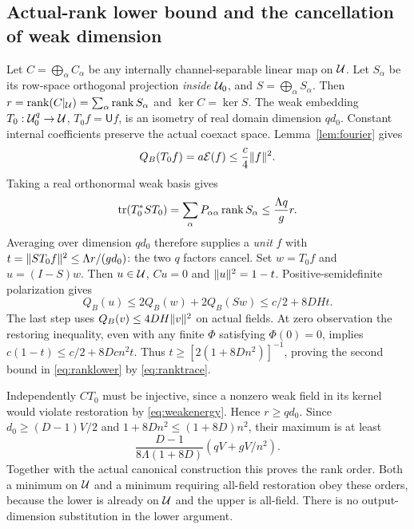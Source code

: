 \subsection{Actual-rank lower bound and the cancellation of weak dimension}
Let $C=\bigoplus_\alpha C_\alpha$ be any internally channel-separable linear
map on $\mathcal U$. Let $S_\alpha$ be its row-space orthogonal projection
\emph{inside} $\mathcal U_0$, and $S=\bigoplus_\alpha S_\alpha$. Then
$r=\operatorname{rank}(C|_\mathcal U)=\sum_\alpha\operatorname{rank} S_\alpha$ and $\ker C=\ker S$.
The weak embedding $T_0:\mathcal U_0^q\to\mathcal U$, $T_0f=\mathsf U f$, is an isometry
of real domain dimension $qd_0$. Constant internal coefficients preserve the
actual coexact space. Lemma~\ref{lem:fourier} gives
\begin{equation}\label{eq:weakenergy}
 Q_B(T_0f)=a\mathcal E(f)\leq\frac c4\lVert f\rVert^2.
\end{equation}
Taking a real orthonormal weak basis gives
\begin{equation}\label{eq:ranktrace}
 \operatorname{tr}(T_0^*ST_0)=\sum_\alpha P_{\alpha\alpha}\operatorname{rank} S_\alpha
       \leq\frac{\Lambda q}{g}r.
\end{equation}
Averaging over dimension $qd_0$ therefore supplies a \emph{unit} $f$ with
$t=\lVert ST_0f\rVert^2\leq\Lambda r/(gd_0)$: the two $q$ factors cancel.
Set $w=T_0f$ and $u=(I-S)w$. Then $u\in\mathcal U$, $Cu=0$ and
$\lVert u\rVert^2=1-t$. Positive-semidefinite polarization gives
\[
 Q_B(u)\leq2Q_B(w)+2Q_B(Sw)\leq c/2+8DHt.
\]
The last step uses $Q_B(v)\leq4DH\lVert v\rVert^2$ on actual fields.
At zero observation the restoring inequality, even with any finite
$\Phi$ satisfying $\Phi(0)=0$, implies
$c(1-t)\leq c/2+8Dcn^2t$. Thus
$t\geq[2(1+8Dn^2)]^{-1}$, proving the second bound in
\eqref{eq:ranklower} by \eqref{eq:ranktrace}.

Independently $CT_0$ must be injective, since a nonzero weak field in its
kernel would violate restoration by \eqref{eq:weakenergy}. Hence $r\geq qd_0$.
Since $d_0\geq(D-1)V/2$ and
$1+8Dn^2\leq(1+8D)n^2$, their maximum is at least
\[
 \frac{D-1}{8\Lambda(1+8D)}(qV+gV/n^2).
\]
Together with the actual canonical construction this proves the rank order.
Both a minimum on $\mathcal U$ and a minimum requiring all-field restoration obey
these orders, because the lower is already on $\mathcal U$ and the upper is all-field.
There is no output-dimension substitution in the lower argument.

